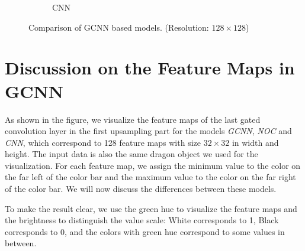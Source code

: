 \begin{figure}[H]
\begin{subfigure}[b]{0.24\linewidth}
		\caption{CNN}
	\end{subfigure}
	\decoRule
	\caption{Comparison of GCNN based models. (Resolution: $ 128\times 128 $)}
	\label{fig:gcnn-eval-multi-model}
\end{figure}


\section{Discussion on the Feature Maps in GCNN}

As shown in the figure, we visualize the feature maps of the last gated convolution layer in the first upsampling part for the models \textit{GCNN}, \textit{NOC} and \textit{CNN}, which correspond to 128 feature maps with size $ 32\times 32 $ in width and height. 
The input data is also the same dragon object we used for the visualization. For each feature map, we assign the minimum value to the color on the far left of the color bar and the maximum value to the color on the far right of the color bar. 
We will now discuss the differences between these models.

To make the result clear, we use the green hue to visualize the feature maps and the brightness to distinguish the value scale: White corresponds to 1, Black corresponds to 0, and the colors with green hue correspond to some values in between. 


